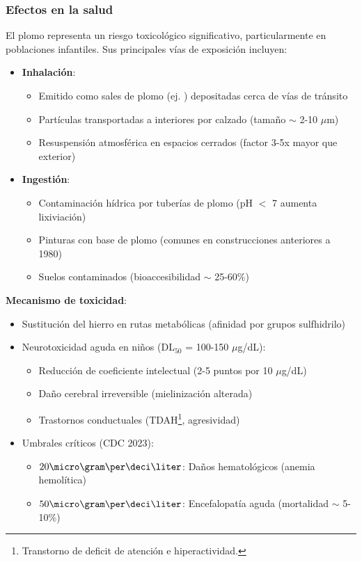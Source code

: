 \subsubsection{Efectos en la salud} El plomo representa un riesgo toxicol\'{o}gico significativo, particularmente en poblaciones infantiles. Sus principales v\'{i}as de exposici\'{o}n incluyen:

\begin{itemize}
    \item \textbf{Inhalaci\'{o}n}: 
    \begin{itemize}
        \item Emitido como sales de plomo (ej. ) depositadas cerca de v\'{i}as de tr\'{a}nsito
        \item Part\'{i}culas transportadas a interiores por calzado (tama\~no $\sim$ 2-10 $\mu$m)
        \item Resuspensi\'{o}n atmosf\'{e}rica en espacios cerrados (factor 3-5x mayor que exterior)
    \end{itemize}
    
    \item \textbf{Ingesti\'{o}n}:
    \begin{itemize}
        \item Contaminaci\'{o}n h\'{i}drica por tuber\'{i}as de plomo (pH $<$ 7 aumenta lixiviaci\'{o}n)
        \item Pinturas con base de plomo (comunes en construcciones anteriores a 1980)
        \item Suelos contaminados (bioaccesibilidad $\sim$ 25-60\%)
    \end{itemize}
\end{itemize}

\textbf{Mecanismo de toxicidad}:
\begin{itemize}
    \item Sustituci\'{o}n del hierro en rutas metab\'{o}licas (afinidad por grupos sulfhidrilo)
    \item Neurotoxicidad aguda en ni\~nos (DL$_{50}$ = 100-150 $\mu$g/dL):
    \begin{itemize}
        \item Reducci\'{o}n de coeficiente intelectual (2-5 puntos por 10 $\mu$g/dL)
        \item Da\~no cerebral irreversible (mielinizaci\'{o}n alterada)
        \item Trastornos conductuales (TDAH\footnote{Transtorno de deficit de atenci\'on e hiperactividad.}, agresividad)
    \end{itemize}
    
    \item Umbrales cr\'{i}ticos (CDC 2023):
    \begin{itemize}
        \item $20\micro\gram\per\deci\liter$: Da\~nos hematol\'{o}gicos (anemia hemol\'{i}tica)
        \item $50 \micro\gram\per\deci\liter$: Encefalopat\'{i}a aguda (mortalidad $\sim$ 5-10\%)
    \end{itemize}
\end{itemize}

